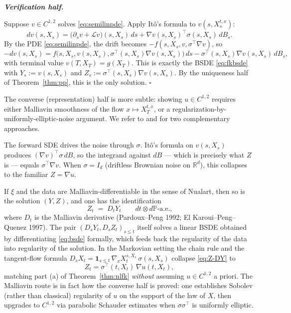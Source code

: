 \documentclass{article}
\newenvironment{proof}[1][Proof]{%
  \par\smallskip\noindent\textit{\textbf{#1.}}\quad\ignorespaces
}{%
  \hfill$\square$\par\smallskip
}
\newcommand{\Prob}{\mathbb{P}}
\newcommand{\R}{\mathbb{R}}
\newcommand{\Lc}{\mathcal{L}}
\begin{document}
\begin{proof}[Verification half]
Suppose $v \in C^{1,2}$ solves \eqref{eq:semilinpde}. Apply It\^o's formula to $v(s, X^{t,x}_s)$:
\[
  dv(s, X_s) = \big(\partial_s v + \Lc v\big)(s, X_s)\,ds + \nabla v(s, X_s)^{\top} \sigma(s, X_s)\, dB_s.
\]
By the PDE \eqref{eq:semilinpde}, the drift becomes $-f(s, X_s, v, \sigma^{\top} \nabla v)$, so
\[
  -dv(s, X_s) = f\!\big(s, X_s, v(s, X_s), \sigma^{\top}(s, X_s) \nabla v(s, X_s)\big)\,ds - \sigma^{\top}(s, X_s) \nabla v(s, X_s)\, dB_s,
\]
with terminal value $v(T, X_T) = g(X_T)$. This is exactly the BSDE \eqref{eq:fkbsde} with $Y_s := v(s, X_s)$ and $Z_s := \sigma^{\top}(s, X_s) \nabla v(s, X_s)$. By the uniqueness half of Theorem~\ref{thm:pp}, this is the only solution.
\end{proof}

The converse (representation) half is more subtle: showing $u \in C^{1,2}$ requires either Malliavin smoothness of the flow $x \mapsto X^{t,x}_T$, or a regularization-by-uniformly-elliptic-noise argument. We refer to \cite{el-karoui-quenez} and \cite{pardoux-rascanu} for two complementary approaches.

\begin{remark}
The forward SDE drives the noise through $\sigma$. It\^o's formula on $v(s, X_s)$ produces $(\nabla v)^{\top} \sigma\, dB$, so the integrand against $dB$ --- which is precisely what $Z$ is --- equals $\sigma^{\top} \nabla v$. When $\sigma = I_d$ (driftless Brownian noise on $\R^d$), this collapses to the familiar $Z = \nabla u$.
\end{remark}

\begin{remark}\label{rem:malliavin}
If $\xi$ and the data are Malliavin-differentiable in the sense of Nualart, then so is the solution $(Y, Z)$, and one has the identification
\begin{equation}\label{eq:Z-DY}
  Z_t \;=\; D_t Y_t \qquad dt \otimes d\Prob\text{-a.e.,}
\end{equation}
where $D_t$ is the Malliavin derivative (Pardoux--Peng 1992; El Karoui--Peng--Quenez 1997). The pair $(D_s Y_t, D_s Z_t)_{s \le t}$ itself solves a linear BSDE obtained by differentiating \eqref{eq:bsde} formally, which feeds back the regularity of the data into regularity of the solution. In the Markovian setting the chain rule and the tangent-flow formula $D_s X_t = \mathbf{1}_{s \le t}\,\nabla_x X^{s,X_s}_t\, \sigma(s, X_s)$ collapse \eqref{eq:Z-DY} to
\[
  Z_t = \sigma^{\top}(t, X_t)\, \nabla u(t, X_t),
\]
matching part (a) of Theorem~\ref{thm:nlfk} \emph{without} assuming $u \in C^{1,2}$ a priori. The Malliavin route is in fact how the converse half is proved: one establishes Sobolev (rather than classical) regularity of $u$ on the support of the law of $X$, then upgrades to $C^{1,2}$ via parabolic Schauder estimates when $\sigma\sigma^{\top}$ is uniformly elliptic.
\end{remark}
\end{document}

